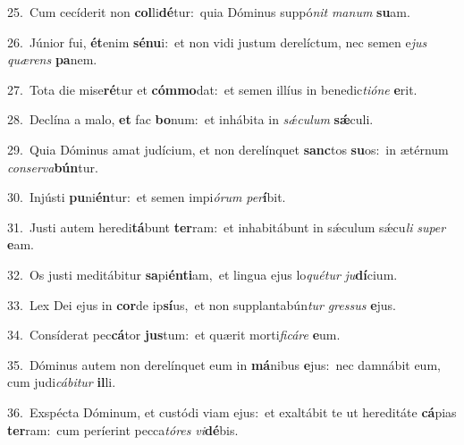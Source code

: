 {\numbfont\textcolor{\numbcolor}{25.}}~Cum cecíderit non \textbf{col}\-li\-\textbf{dé}\-tur:~\star quia Dóminus suppó\textit{nit} \textit{ma}\-\textit{num} \textbf{su}\-am.\par
{\numbfont\textcolor{\numbcolor}{26.}}~Júnior fui, \textbf{ét}\-enim \textbf{sé}\-\textbf{nu}i:~\star et non vidi justum derelíctum, nec semen e\textit{jus} \textit{quæ}\-\textit{rens} \textbf{pa}\-nem.\par
{\numbfont\textcolor{\numbcolor}{27.}}~Tota die mise\-\textbf{ré}\-tur et \textbf{cóm}\-\textbf{mo}dat:~\star et semen illíus in benedic\-\textit{ti}\-\textit{ó}\textit{ne} \textbf{e}\-rit.\par
{\numbfont\textcolor{\numbcolor}{28.}}~Declína a malo, \textbf{et} fac \textbf{bo}\-num:~\star et inhábita in \textit{sǽ}\-\textit{cu}\textit{lum} \textbf{sǽ}\-culi.\par
{\numbfont\textcolor{\numbcolor}{29.}}~Quia Dóminus amat judícium, et non derelínquet \textbf{sanc}\-tos \textbf{su}\-os:~\star in ætérnum \textit{con}\-\textit{ser}\textit{va}\textbf{bún}tur.\par
{\numbfont\textcolor{\numbcolor}{30.}}~Injústi \textbf{pu}\-ni\-\textbf{én}\-tur:~\star et semen impi\-\textit{ó}\-\textit{rum} \textit{per}\-\textbf{í}bit.\par
{\numbfont\textcolor{\numbcolor}{31.}}~Justi autem heredi\-\textbf{tá}\-bunt \textbf{ter}\-ram:~\star et inhabitábunt in sǽculum sǽcu\textit{li} \textit{su}\-\textit{per} \textbf{e}\-am.\par
{\numbfont\textcolor{\numbcolor}{32.}}~Os justi meditábitur \textbf{sa}\-pi\-\textbf{én}\-\textbf{ti}am,~\star et lingua ejus lo\-\textit{qué}\-\textit{tur} \textit{ju}\-\textbf{dí}cium.\par
{\numbfont\textcolor{\numbcolor}{33.}}~Lex Dei ejus in \textbf{cor}\-de ip\-\textbf{sí}\-us,~\star et non supplantabún\textit{tur} \textit{gres}\-\textit{sus} \textbf{e}\-jus.\par
{\numbfont\textcolor{\numbcolor}{34.}}~Consíderat pec\-\textbf{cá}\-tor \textbf{jus}\-tum:~\star et quærit morti\-\textit{fi}\-\textit{cá}\textit{re} \textbf{e}\-um.\par
{\numbfont\textcolor{\numbcolor}{35.}}~Dóminus autem non derelínquet eum in \textbf{má}\-nibus \textbf{e}\-jus:~\star nec damnábit eum, cum judi\-\textit{cá}\-\textit{bi}\textit{tur} \textbf{il}\-li.\par
{\numbfont\textcolor{\numbcolor}{36.}}~Exspécta Dóminum, et custódi viam ejus:~\dagger et exaltábit te ut hereditáte \textbf{cá}\-pias \textbf{ter}\-ram:~\star cum períerint pecca\-\textit{tó}\-\textit{res} \textit{vi}\-\textbf{dé}bis.\par
